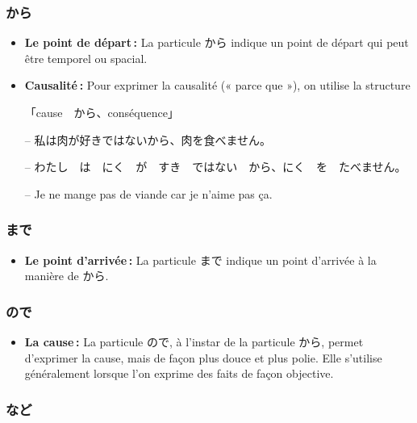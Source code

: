         \subsubsection{から}

    \begin{itemize}
        \item \textbf{Le point de départ :} La particule から indique un point de départ qui peut être temporel ou spacial.
        \item \textbf{Causalité :} Pour exprimer la causalité (« parce que »), on utilise la structure 
        \begin{center}
            「cause　から、conséquence」
        \end{center}
        \begin{tcolorbox}
            -- 私は肉が好きではないから、肉を食べません。

            -- わたし　は　にく　が　すき　ではない　から、にく　を　たべません。

            -- Je ne mange pas de viande car je n'aime pas ça.
        \end{tcolorbox}
    \end{itemize}

        \subsubsection{まで}

    \begin{itemize}
        \item \textbf{Le point d'arrivée :} La particule まで indique un point d'arrivée à la manière de から.
    \end{itemize}

        \subsubsection{ので}

    \begin{itemize}
        \item \textbf{La cause :} La particule ので, à l'instar de la particule から, permet d'exprimer la cause, mais de façon plus douce et plus polie. Elle s'utilise généralement lorsque l'on exprime des faits de façon objective.
    \end{itemize}

        \subsubsection{など}

